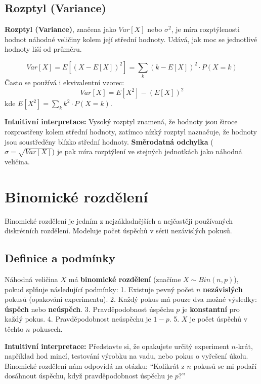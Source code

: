 \documentclass[
  czech,
  11pt,
  letterpaper,
  DIV=11,
  numbers=noendperiod]{scrreprt}
\begin{document}
\subsection{Rozptyl (Variance)}\label{rozptyl-variance}

{\textbf{Rozptyl (Variance)}}, značena jako \(Var[X]\) nebo
\(\sigma^2\), je míra rozptýlenosti hodnot náhodné veličiny kolem její
střední hodnoty. Udává, jak moc se jednotlivé hodnoty liší od průměru.

\[ Var[X] = E[(X - E[X])^2] = \sum_{k} (k - E[X])^2 \cdot P(X=k) \]
Často se používá i ekvivalentní vzorec: \[ Var[X] = E[X^2] - (E[X])^2 \]
kde \(E[X^2] = \sum_{k} k^2 \cdot P(X=k)\).

\textbf{Intuitivní interpretace:} Vysoký rozptyl znamená, že hodnoty
jsou široce rozprostřeny kolem střední hodnoty, zatímco nízký rozptyl
naznačuje, že hodnoty jsou soustředěny blízko střední hodnoty.
\textbf{Směrodatná odchylka} (\(\sigma = \sqrt{Var[X]}\)) je pak míra
rozptýlení ve stejných jednotkách jako náhodná veličina.

\section{Binomické rozdělení}\label{binomickuxe9-rozdux11blenuxed}

Binomické rozdělení je jedním z nejzákladnějších a nejčastěji
používaných diskrétních rozdělení. Modeluje počet úspěchů v sérii
nezávislých pokusů.

\subsection{Definice a podmínky}\label{definice-a-podmuxednky}

Náhodná veličina \(X\) má {\textbf{binomické rozdělení}} (značíme
\(X \sim Bin(n, p)\)), pokud splňuje následující podmínky: 1. Existuje
pevný počet \(n\) \textbf{nezávislých} pokusů (opakování experimentu).
2. Každý pokus má pouze dva možné výsledky: \textbf{úspěch} nebo
\textbf{neúspěch}. 3. Pravděpodobnost úspěchu \(p\) je
\textbf{konstantní} pro každý pokus. 4. Pravděpodobnost neúspěchu je
\(1-p\). 5. \(X\) je počet úspěchů v těchto \(n\) pokusech.

\textbf{Intuitivní interpretace:} Představte si, že opakujete určitý
experiment \(n\)-krát, například hod mincí, testování výrobku na vadu,
nebo pokus o vyřešení úkolu. Binomické rozdělení nám odpovídá na otázku:
``Kolikrát z \(n\) pokusů se mi podaří dosáhnout úspěchu, když
pravděpodobnost úspěchu je \(p\)?''
\end{document}
